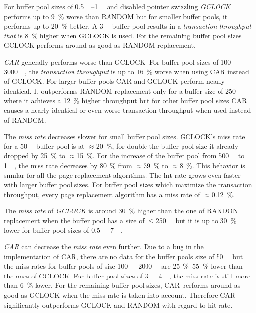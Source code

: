     For buffer pool sizes of \SIrange{0.5}{1}{\gibi\byte} and disabled pointer swizzling \emph{GCLOCK} performs up to \SI{9}{\percent} worse than RANDOM but for smaller buffer pools, it performs up to \SI{20}{\percent} better. A \SI{3}{\gibi\byte} buffer pool results in a \emph{transaction throughput that} is \SI{8}{\percent} higher when GCLOCK is used. For the remaining buffer pool sizes GCLOCK performs around as good as RANDOM replacement.

    \emph{CAR} generally performs worse than GCLOCK. For buffer pool sizes of \SIrange{100}{3000}{\mebi\byte}, the \emph{transaction throughput} is up to \SI{16}{\percent} worse when using CAR instead of GCLOCK. For larger buffer pools CAR and GCLOCK perform nearly identical. It outperforms RANDOM replacement only for a buffer size of \SI{250}{\mebi\byte} where it achieves a \SI{12}{\percent} higher throughput but for other buffer pool sizes CAR causes a nearly identical or even worse transaction throughput when used instead of RANDOM.

    The \emph{miss rate} decreases slower for small buffer pool sizes. GCLOCK's miss rate for a \SI{50}{\mebi\byte} buffer pool is at $\approx$\SI{20}{\percent}, for double the buffer pool size it already dropped by \SI{25}{\percent} to $\approx$\SI{15}{\percent}. For the increase of the buffer pool from \SI{500}{\mebi\byte} to \SI{1}{\gibi\byte}, the miss rate decreases by \SI{80}{\percent} from $\approx$\SI{39}{\percent} to $\approx$\SI{8}{\percent}. This behavior is similar for all the page replacement algorithms. The hit rate grows even faster with larger buffer pool sizes. For buffer pool sizes which maximize the transaction throughput, every page replacement algorithm has a miss rate of $\approx$\SI{0.12}{\percent}.

    The \emph{miss rate} of \emph{GCLOCK} is around \SI{30}{\percent} higher than the one of RANDON replacement when the buffer pool has a size of $\leq$\SI{250}{\mebi\byte} but it is up to \SI{30}{\percent} lower for buffer pool sizes of \SIrange{0.5}{7}{\gibi\byte}.

    \emph{CAR} can decrease the \emph{miss rate} even further. Due to a bug in the implementation of CAR, there are no data for the buffer pools size of \SI{50}{\mebi\byte} but the miss rates for buffer pools of size \SIrange{100}{2000}{\mebi\byte} are \SIrange{25}{55}{\percent} lower than the ones of GCLOCK. For buffer pool sizes of \SIrange{3}{4}{\gibi\byte}, the miss rate is still more than \SI{6}{\percent} lower. For the remaining buffer pool sizes, CAR performs around as good as GCLOCK when the miss rate is taken into account. Therefore CAR significantly outperforms GCLOCK and RANDOM with regard to hit rate.

